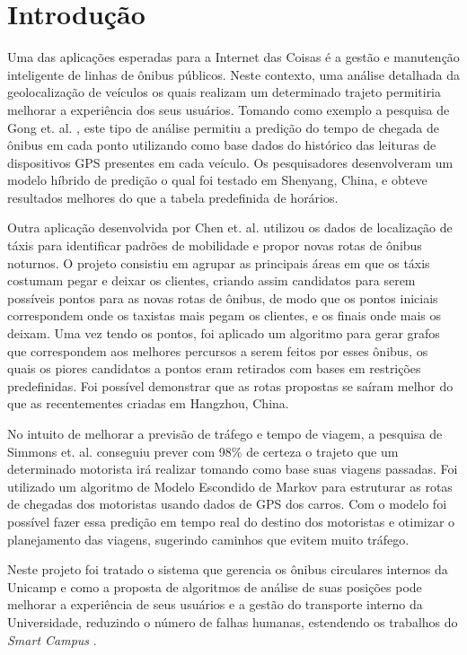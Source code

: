 \documentclass[11pt,twoside]{article}
\begin{document}
\section{Introdução}
Uma das aplicações esperadas para a Internet das Coisas é a gestão e manutenção inteligente de linhas de ônibus públicos. Neste contexto, uma análise detalhada da geolocalização de veículos os quais realizam um determinado trajeto permitiria melhorar a experiência dos seus usuários.  Tomando como exemplo a pesquisa de Gong et. al. \cite{GONG}, este tipo de análise permitiu a predição do tempo de chegada de ônibus em cada ponto utilizando como base dados do histórico das leituras de dispositivos GPS presentes em cada veículo. Os pesquisadores desenvolveram um modelo híbrido de predição o qual foi testado em Shenyang, China, e obteve resultados melhores do que a tabela predefinida de horários.

Outra aplicação desenvolvida por Chen et. al. \cite{CHEN} utilizou os dados de localização de táxis para identificar padrões de mobilidade e propor novas rotas de ônibus noturnos. O projeto consistiu em agrupar as principais áreas em que os táxis costumam pegar e deixar os clientes, criando assim candidatos para serem possíveis pontos para as novas rotas de ônibus, de modo que os pontos iniciais correspondem onde os taxistas mais pegam os clientes, e os finais onde mais os deixam. Uma vez tendo os pontos, foi aplicado um algoritmo para gerar grafos que correspondem aos melhores percursos a serem feitos por esses ônibus, os quais os piores candidatos a pontos eram retirados com bases em restrições predefinidas. Foi possível demonstrar que as rotas propostas se saíram melhor do que as recentementes criadas em Hangzhou, China. 

No intuito de melhorar a previsão de tráfego e tempo de viagem, a pesquisa de Simmons et. al. \cite{SIMONS} conseguiu prever com 98\% de certeza o trajeto que um determinado motorista irá realizar tomando como base suas viagens passadas. Foi utilizado um algoritmo de Modelo Escondido de Markov para estruturar as rotas de chegadas dos motoristas usando dados de GPS dos carros. Com o modelo foi possível fazer essa predição em tempo real do destino dos motoristas e otimizar o planejamento das viagens, sugerindo caminhos que evitem muito tráfego.    

Neste projeto foi tratado o sistema que gerencia os ônibus circulares internos da Unicamp e como a proposta de algoritmos de análise de suas posições pode melhorar a experiência de seus usuários e a gestão do transporte interno da Universidade, reduzindo o número de falhas humanas, estendendo os trabalhos do \emph{Smart Campus} \cite{SMART}.
\end{document}
